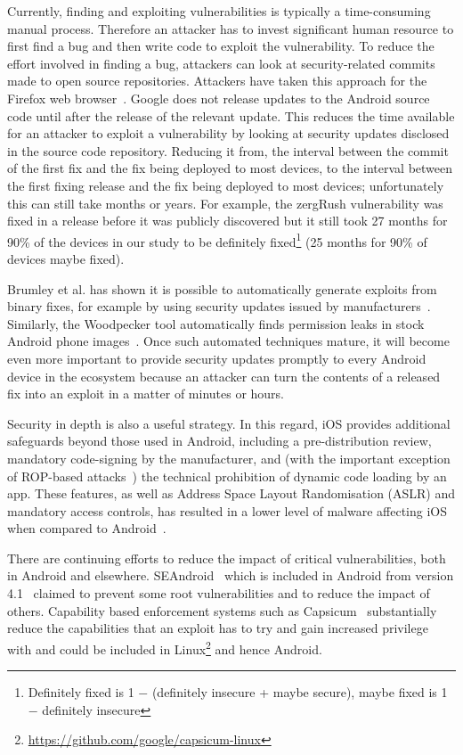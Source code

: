 \documentclass{llncs}
\begin{document}
Currently, finding and exploiting vulnerabilities is typically a time-consuming manual process.
Therefore an attacker has to invest significant human resource to first find a bug and then write code to exploit the vulnerability.
To reduce the effort involved in finding a bug, attackers can look at security-related commits made to open source repositories.
Attackers have taken this approach for the Firefox web browser~\cite{Barth2011}.
Google does not release updates to the Android source code until after the release of the relevant update.
This reduces the time available for an attacker to exploit a vulnerability by looking at security updates disclosed in the source code repository.
Reducing it from, the interval between the commit of the first fix and the fix being deployed to most devices, to the interval between the first fixing release and the fix being deployed to most devices; unfortunately this can still take months or years.
For example, the zergRush vulnerability was fixed in a release before it was publicly discovered but it still took 27 months for 90\% of the devices in our study to be definitely fixed\footnote{Definitely fixed is 1 $-$ (definitely insecure + maybe secure), maybe fixed is 1 $-$ definitely insecure} (25 months for 90\% of devices maybe fixed).

Brumley et al. has shown it is possible to automatically generate exploits from binary fixes, for example by using security updates issued by manufacturers~\cite{Brumley2008}. 
Similarly, the Woodpecker tool automatically finds permission leaks in stock Android phone images~\cite{Grace2012}.
Once such automated techniques mature, it will become even more important to provide security updates promptly to every Android device in the ecosystem because an attacker can turn the contents of a released fix into an exploit in a matter of minutes or hours.

Security in depth is also a useful strategy.
In this regard, iOS provides additional safeguards beyond those used in Android, including a pre-distribution review, mandatory code-signing by the manufacturer, and (with the important exception of ROP-based attacks~\cite{Wang2013a}) the technical prohibition of dynamic code loading by an app.
These features, as well as Address Space Layout Randomisation (ASLR) and mandatory access controls, has resulted in a lower level of malware affecting iOS when compared to Android~\cite{Felt2011}.

There are continuing efforts to reduce the impact of critical vulnerabilities, both in Android and elsewhere.
SEAndroid~\cite{Smalley2013} which is included in Android from version 4.1~\cite{jelly-bean-release} claimed to prevent some root vulnerabilities and to reduce the impact of others.
Capability based enforcement systems such as Capsicum~\cite{Watson2010} substantially reduce the capabilities that an exploit has to try and gain increased privilege with and could be included in Linux\footnote{\url{https://github.com/google/capsicum-linux}} and hence Android.
\end{document}
